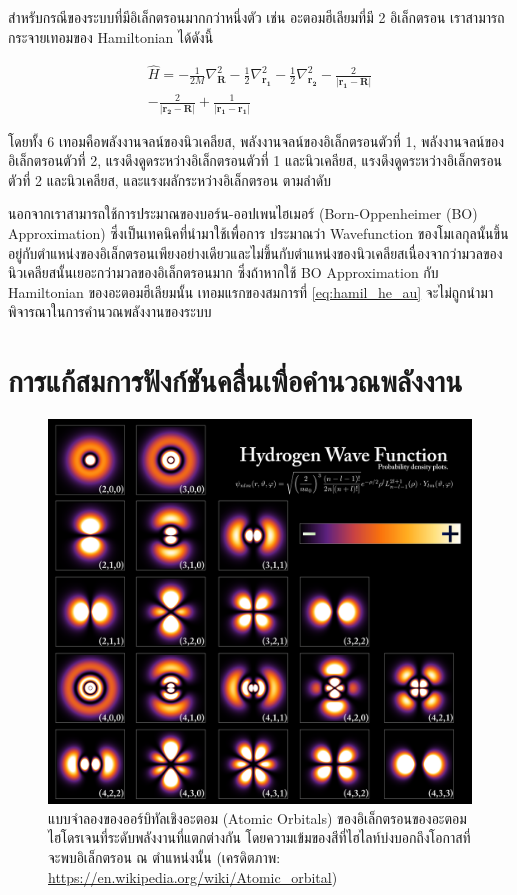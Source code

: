 สำหรับกรณีของระบบที่มีอิเล็กตรอนมากกว่าหนึ่งตัว เช่น อะตอมฮีเลียมที่มี 2 อิเล็กตรอน เราสามารถกระจายเทอมของ Hamiltonian ได้ดังนี้

\begin{multline}\label{eq:hamil_he_au}
    \hat{H} = -\frac{1}{2M} \nabla^{2}_{\bm{R}}
    -\frac{1}{2} \nabla^{2}_{\bm{r_{1}}}
    -\frac{1}{2} \nabla^{2}_{\bm{r_{2}}}
    -\frac{2}{|\bm{r_{1}}-\bm{R}|}
    \\
    -\frac{2}{|\bm{r_{2}}-\bm{R}|}
    +\frac{1}{|\bm{r_{1}}-\bm{r_{1}}|}
\end{multline}

\noindent โดยทั้ง 6 เทอมคือพลังงานจลน์ของนิวเคลียส, พลังงานจลน์ของอิเล็กตรอนตัวที่ 1, พลังงานจลน์ของอิเล็กตรอนตัวที่ 2,
แรงดึงดูดระหว่างอิเล็กตรอนตัวที่ 1 และนิวเคลียส, แรงดึงดูดระหว่างอิเล็กตรอนตัวที่ 2 และนิวเคลียส, และแรงผลักระหว่างอิเล็กตรอน ตามลำดับ

นอกจากเราสามารถใช้การประมาณของบอร์น-ออปเพนไฮเมอร์ (Born-Oppenheimer (BO) Approximation) ซึ่งเป็นเทคนิคที่นำมาใช้เพื่อการ%
ประมาณว่า Wavefunction ของโมเลกุลนั้นขึ้นอยู่กับตำแหน่งของอิเล็กตรอนเพียงอย่างเดียวและไม่ขึ้นกับตำแหน่งของนิวเคลียสเนื่องจากว่ามวลของ%
นิวเคลียสนั้นเยอะกว่ามวลของอิเล็กตรอนมาก ซึ่งถ้าหากใช้ BO Approximation กับ Hamiltonian ของอะตอมฮีเลียมนั้น เทอมแรกของสมการที่
\eqref{eq:hamil_he_au} จะไม่ถูกนำมาพิจารณาในการคำนวณพลังงานของระบบ

\section{การแก้สมการฟังก์ชันคลื่นเพื่อคำนวณพลังงาน}
\label{sec:wavefunc_ener}

\begin{figure}[htbp]
    \centering
    \includegraphics[width=0.9\linewidth]{fig/hydrogen_density_plots.png}
    \caption{แบบจำลองของออร์บิทัลเชิงอะตอม (Atomic Orbitals) ของอิเล็กตรอนของอะตอมไฮโดรเจนที่ระดับพลังงานที่แตกต่างกัน
        โดยความเข้มของสีที่ไฮไลท์บ่งบอกถึงโอกาสที่จะพบอิเล็กตรอน ณ ตำแหน่งนั้น
        (เครดิตภาพ: \url{https://en.wikipedia.org/wiki/Atomic_orbital})}
    \label{fig:hydrogen_density}
\end{figure}

